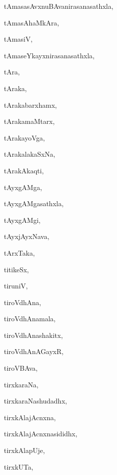 \begin{multicols}{3}
{\noindent
{tAmasasAvxnuBAvanirasanasathxla}, \pageref{tAmasasAvxnuBAvanirasanasathxla}

\noindent
{tAmasAhaMkAra}, \pageref{tAmasAhaMkAra}

\noindent
{tAmasiV}, \pageref{tAmasiV}

\noindent
{tAmaseYkayxnirasanasathxla}, \pageref{tAmaseYkayxnirasanasathxla}

\noindent
{tAra}, \pageref{tAra}

\noindent
{tAraka}, \pageref{tAraka}

\noindent
{tArakabarxhamx}, \pageref{tArakabarxhamx}

\noindent
{tArakamaMtarx}, \pageref{tArakamaMtarx}

\noindent
{tArakayoVga}, \pageref{tArakayoVga}

\noindent
{tArakalakaSxNa}, \pageref{tArakalakaSxNa}

\noindent
{tArakAkaqti}, \pageref{tArakAkaqti}

\noindent
{tAyxgAMga}, \pageref{tAyxgAMga}

\noindent
{tAyxgAMgasathxla}, \pageref{tAyxgAMgasathxla}

\noindent
{tAyxgAMgi}, \pageref{tAyxgAMgi}

\noindent
{tAyxjAyxNava}, \pageref{tAyxjAyxNava}

\noindent
{tArxTaka}, \pageref{tArxTaka}

\noindent
{titikeSx}, \pageref{titikeSx}

\noindent
{tiruniV{\ru}}, \pageref{tiruniVru}

\noindent
{tiroVdhAna}, \pageref{tiroVdhAna}

\noindent
{tiroVdhAnamala}, \pageref{tiroVdhAnamala}

\noindent
{tiroVdhAnashakitx}, \pageref{tiroVdhAnashakitx}

\noindent
{tiroVdhAnAGayxR}, \pageref{tiroVdhAnAGayxR}

\noindent
{tiroVBAva}, \pageref{tiroVBAva}

\noindent
{tirxkaraNa}, \pageref{tirxkaraNa}

\noindent
{tirxkaraNashudadhx}, \pageref{tirxkaraNashudadhx}

\noindent
{tirxkAlajAcnxna}, \pageref{tirxkAlajAcnxna}

\noindent
{tirxkAlajAcnxnasididhx}, \pageref{tirxkAlajAcnxnasididhx}

\noindent
{tirxkAlapUje}, \pageref{tirxkAlapUje}

\noindent
{tirxkUTa}, \pageref{tirxkUTa}

}
\end{multicols}
